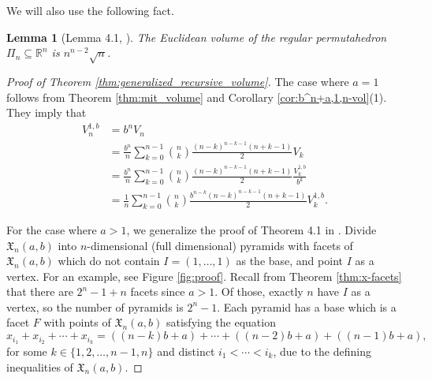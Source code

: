 \documentclass[11pt]{amsart}
\newtheorem{lemma}[theorem]{Lemma}
\theoremstyle{definition}
\newcommand{\0}{\emptyset}
\newcommand{\R}{\mathbb{R}}
\newcommand{\Xn}{\mathfrak{X}_{n}(a,b)}
\begin{document}
We will also use the following fact.

\begin{lemma}[Lemma 4.1, \cite{BCC}]\label{lem:euclidean_volume}
The Euclidean volume of the regular permutahedron $\Pi_n \subseteq \R^n$ is $n^{n-2}\sqrt{n}$.
\end{lemma}


\begin{proof}[Proof of Theorem \ref{thm:generalized_recursive_volume}]
The case where $a=1$ follows from Theorem \ref{thm:mit_volume} and Corollary \ref{cor:b^n+a,1,n-vol}(1). 
They imply that 
\begin{align*}
    V^{1,b}_n &= b^n V_n \\
    &= \frac{b^n}{n} \sum_{k=0}^{n-1} \binom{n}{k} \frac{(n-k)^{n-k-1}(n+k-1)}{2} V_k\\
    &= \frac{b^n}{n} \sum_{k=0}^{n-1} \binom{n}{k} \frac{(n-k)^{n-k-1}(n+k-1)}{2} \frac{V^{1,b}_k}{b^k}\\
    &= \frac{1}{n} \sum_{k=0}^{n-1} \binom{n}{k} \frac{b^{n-k}(n-k)^{n-k-1}(n+k-1)}{2}V^{1,b}_k.
\end{align*}

For the case where $a>1$, we generalize the proof of Theorem 4.1 in \cite{AW}. 
Divide $\Xn$ into $n$-dimensional (full dimensional) pyramids with facets of $\Xn$ which do not contain $I = (1, \ldots, 1)$ as the base, and point $I$ as a vertex. 
For an example, see Figure \ref{fig:proof}.
Recall from Theorem \ref{thm:x-facets} that there are $2^n-1+n$ facets since $a>1$.
Of those, exactly $n$ have $I$ as a vertex, so the number of pyramids is $2^n-1$.
Each pyramid has a base which is a facet $F$ with points of $\Xn$ satisfying the equation
\[ x_{i_1} + x_{i_2} + \cdots + x_{i_k}  = ((n-k)b+a) + \cdots + ((n-2)b + a) + ((n-1)b+a),\]
for some $k \in \{1,2,\ldots, n-1, n\}$ and distinct $i_1 < \cdots < i_k$, due to the defining inequalities of $\Xn$. 


\end{proof}
\end{document}
